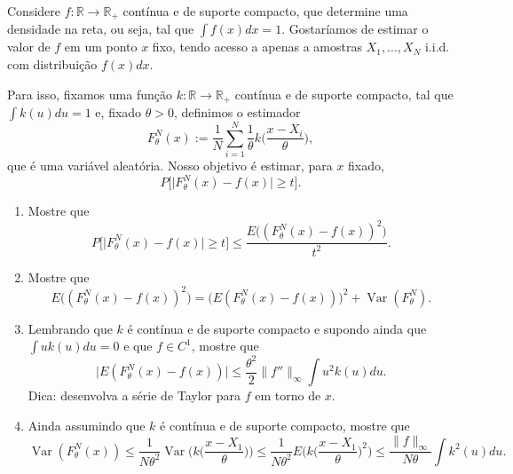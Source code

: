 \documentclass{article}
\newcommand*\1{\mathds{1}}
\DeclareMathOperator{\Var}{Var}
\begin{document}
\pagebreak

\vspace{4mm}
 Considere $f: \mathbb{R} \to \mathbb{R}_+$ contínua e de suporte compacto, que determine uma densidade na reta, ou seja, tal que $\int f(x) dx = 1$.
Gostaríamos de estimar o valor de $f$ em um ponto $x$ fixo, tendo acesso a apenas a amostras $X_1, \dots, X_N$ i.i.d. com distribuição $f(x) dx$.

Para isso, fixamos uma função $k: \mathbb{R} \to \mathbb{R}_+$ contínua e de suporte compacto, tal que $\int k(u) du = 1$ e, fixado $\theta > 0$, definimos o estimador
\begin{equation}
  F_\theta^N(x) := \frac{1}{N} \sum_{i = 1}^N \frac{1}{\theta}
  k \Big( \frac{x - X_i}{\theta} \Big),
\end{equation}
que é uma variável aleatória.
Nosso objetivo é estimar, para $x$ fixado,
\begin{equation}
  P \big[ \big| F_\theta^N(x) - f(x) \big| \geq t \big].
\end{equation}
\begin{enumerate}[\quad a)]
\item Mostre que
  \begin{equation}
    P \big[ \big| F_\theta^N(x) - f(x) \big| \geq t \big]
    \leq \frac{E \big( ( F_\theta^N(x) - f(x) )^2 \big)}{t^2}.
  \end{equation}
\item Mostre que
  \begin{equation}
    E \big( ( F_\theta^N(x) - f(x) )^2 \big)
    = \big( E (F_\theta^N(x) - f(x)) \big)^2
    + \Var(F_\theta^N).
  \end{equation}
\item Lembrando que $k$ é contínua e de suporte compacto e supondo ainda que $\int u k(u) du = 0$ e que $f \in C^1$, mostre que
  \begin{equation}
    \big| E (F_\theta^N(x) - f(x)) \big|
    \leq \frac{\theta^2}{2} \lVert f'' \rVert_\infty \int u^2 k(u) du.
  \end{equation}
  Dica: desenvolva a série de Taylor para $f$ em torno de $x$.
\item Ainda assumindo que $k$ é contínua e de suporte compacto, mostre que
  \begin{equation}
    \Var(F_\theta^N(x)) \leq \frac{1}{N \theta^2}
    \Var \Big( k \Big( \frac{x - X_1}{\theta} \Big) \Big)
    \leq \frac{1}{N \theta^2}
    E \Big( k \Big( \frac{x - X_1}{\theta} \Big)^2 \Big)
    \leq \frac{\lVert f \rVert_\infty}{N \theta} \int k^2(u) du.
  \end{equation}
\end{enumerate}
\end{document}
